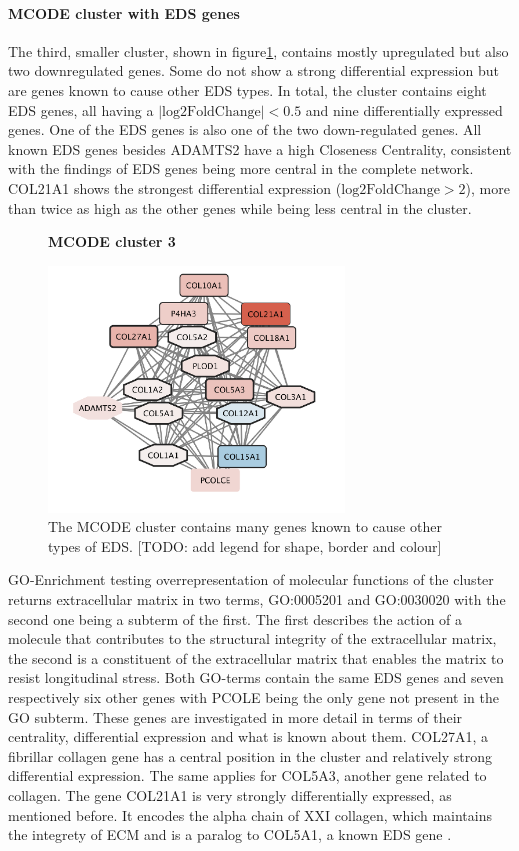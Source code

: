 \paragraph{MCODE cluster with EDS genes}
The third, smaller cluster, shown in figure\ref{fig:mcode3}, contains mostly upregulated but also two downregulated genes. Some do not show a strong differential expression but are genes known to cause other EDS types. In total, the cluster contains eight EDS genes, all having a $|\text{log2FoldChange}| < 0.5$ and nine differentially expressed genes. One of the EDS genes is also one of the two down-regulated genes. All known EDS genes besides ADAMTS2 have a high Closeness Centrality, consistent with the findings of EDS genes being more central in the complete network. COL21A1 shows the strongest differential expression ($\text{log2FoldChange} > 2$), more than twice as high as the other genes while being less central in the cluster.

\begin{figure}[htb!]
	\centering
	\caption*{\textbf{MCODE cluster 3}}
	\includegraphics[width=0.7\textwidth]{fig/MCODE-cluster3.png}
	\caption[MCODE cluster 3]{\centering The MCODE cluster contains many genes known to cause other types of EDS. [TODO: add legend for shape, border and colour]}
	\label{fig:mcode3}
\end{figure}

GO-Enrichment testing overrepresentation of molecular functions of the cluster returns extracellular matrix in two terms, GO:0005201 and GO:0030020 with the second one being a subterm of the first. The first describes the action of a molecule that contributes to the structural integrity of the extracellular matrix, the second is a constituent of the extracellular matrix that enables the matrix to resist longitudinal stress. Both GO-terms contain the same EDS genes and seven respectively six other genes with PCOLE being the only gene not present in the GO subterm. These genes are investigated in more detail in terms of their centrality, differential expression and what is known about them. COL27A1, a fibrillar collagen gene has a central position in the cluster and relatively strong differential expression. The same applies for COL5A3, another gene related to collagen. The gene COL21A1 is very strongly differentially expressed, as mentioned before. It encodes the alpha chain of XXI collagen, which maintains the integrety of ECM and is a paralog to COL5A1, a known EDS gene \cite{COL21A1}.

